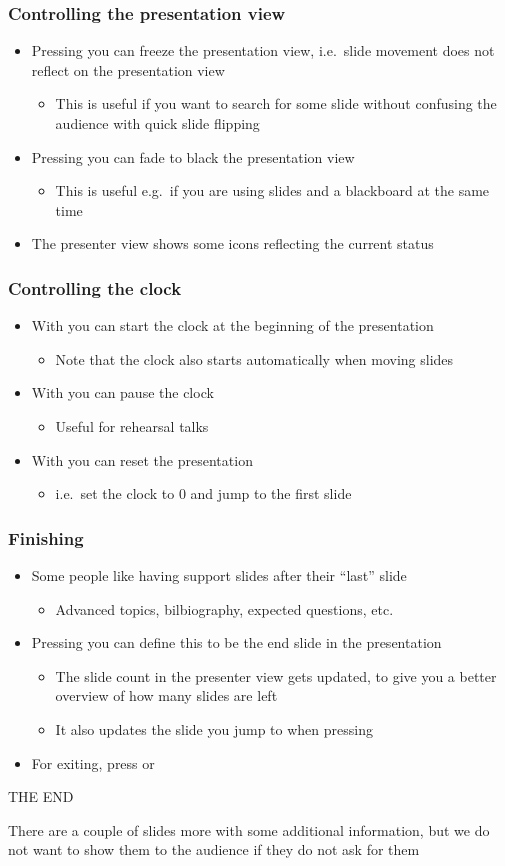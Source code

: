 \documentclass{beamer}
\newcommand{\singleitem}[1]{\begin{itemize}\item #1\end{itemize}}
\begin{document}
\begin{frame}
  \frametitle{Controlling the presentation view}
    \begin{itemize}
      \item Pressing  you can freeze the presentation view, i.e.\
        slide movement does not reflect on the presentation view
        \singleitem{This is useful if you want to search for some slide without
        confusing the audience with quick slide flipping}
      \item Pressing  you can fade to black the presentation view
        \singleitem{This is useful e.g.\ if you are using slides and a
        blackboard at the same time}
      \item The presenter view shows some icons reflecting the current status
    \end{itemize}
\end{frame}

\begin{frame}
  \frametitle{Controlling the clock}
  \begin{itemize}
    \item With  you can start the clock at the beginning of the
      presentation
      \singleitem{Note that the clock also starts automatically when moving slides}
    \item With \keystroke{P} you can pause the clock
      \singleitem{Useful for rehearsal talks}
    \item With  you can reset the presentation
      \singleitem{i.e.\ set the clock to 0 and jump to the first slide}
  \end{itemize}
\end{frame}

\begin{frame}
  \frametitle{Finishing}
  \begin{itemize}
    \item Some people like having support slides after their ``last'' slide
      \singleitem{Advanced topics, bilbiography, expected questions, etc.}
    \item Pressing \keystroke{E} you can define this to be the end slide in the
      presentation
      \singleitem{The slide count in the presenter view gets updated, to give you
      a better overview of how many slides are left}
      \singleitem{It also updates the slide you jump to when pressing \End}
    \item For exiting, press \keystroke{Q} or \Esc
  \end{itemize}
  \vfill
  \begin{center}
    THE END
  \end{center}
  \vfill
  {\footnotesize There are a couple of slides more with some additional information,
  but we do not want to show them to the audience if they do not ask for them}
\end{frame}
\end{document}
